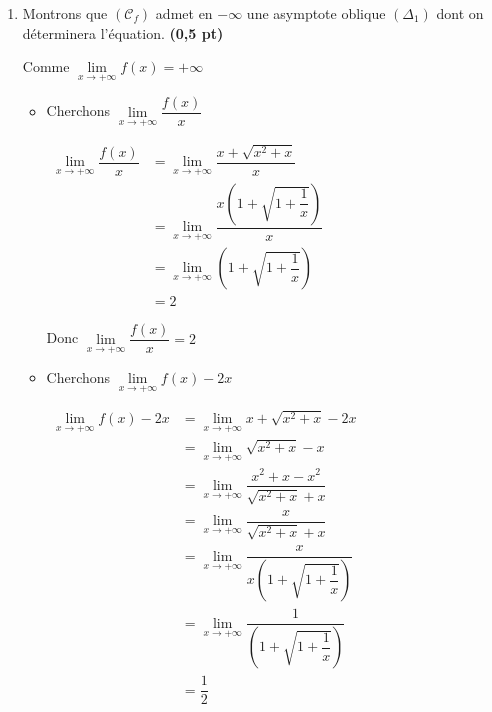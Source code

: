\documentclass[12pt,a4paper]{article}
\begin{document}
\begin{enumerate}
\begin{enumerate}
Sur $]-\infty;0[,\, f(x)-y > 0 $ donc $(\mathcal{C}_f)$ est au-dessus de $(\Delta_1)$


      \end{enumerate}
    \item Montrons que $(\mathcal{C}_f)$ admet en $-\infty$ une asymptote oblique $(\Delta_1)$ dont on déterminera l’équation. \textbf{(0,5 pt)}

Comme $\lim\limits_{x \to +\infty} f(x) = +\infty$  

\begin{itemize}
\item Cherchons  $\lim\limits_{x \to +\infty} \dfrac{f(x)}{x} $  

\(
\begin{aligned}
 \lim\limits_{x \to +\infty} \dfrac{f(x)}{x} &= \lim\limits_{x \to +\infty}  \dfrac{x + \sqrt{x^2+x}}{x}\\
 																	&= \lim\limits_{x \to +\infty} \dfrac{x\left(1 + \sqrt{1+\dfrac{1}{x}}\right)}{x}\\
 																	&= \lim\limits_{x \to +\infty} \left(1 + \sqrt{1+\dfrac{1}{x}}\right)\\
 																	&= 2
\end{aligned}    
\)        

Donc  $\lim\limits_{x \to +\infty} \dfrac{f(x)}{x} = 2 $       

\item Cherchons  $\lim\limits_{x \to +\infty} f(x)-2x $ 

\(
\begin{aligned}
 \lim\limits_{x \to +\infty} f(x)-2x &= \lim\limits_{x \to +\infty} x + \sqrt{x^2+x}-2x\\
 																		 &= \lim\limits_{x \to +\infty} \sqrt{x^2+x}-x\\
 																		 &= \lim\limits_{x \to +\infty} \dfrac{x^2+x-x^2}{\sqrt{x^2+x}+x} \\
 																		 &= \lim\limits_{x \to +\infty} \dfrac{x}{\sqrt{x^2+x}+x} \\
 																		 &= \lim\limits_{x \to +\infty} \dfrac{x}{x\left(1 + \sqrt{1+\dfrac{1}{x}}\right)} \\
 																		 &= \lim\limits_{x \to +\infty} \dfrac{1}{\left(1 + \sqrt{1+\dfrac{1}{x}}\right)} \\
 																	   &= \dfrac{1}{2}
\end{aligned}    
\)   
 
\end{itemize}
  		    

\end{enumerate}
\end{document}
